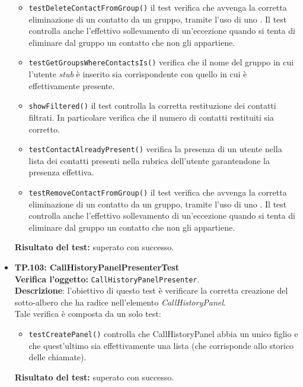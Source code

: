 \begin{itemize}
\begin{itemize}
\item \texttt{testDeleteContactFromGroup()} il test verifica che avvenga la corretta eliminazione di un contatto da un gruppo, tramite l'uso di uno . Il test controlla anche l'effettivo sollevamento di un'eccezione quando si tenta di eliminare dal gruppo un contatto che non gli appartiene.
\item \texttt{testGetGroupsWhereContactsIs()} verifica che il nome del gruppo in cui l'utente \textit{stub} è inserito sia corrispondente con quello in cui è effettivamente presente.
\item \texttt{showFiltered()} il test controlla la corretta restituzione dei contatti filtrati. In particolare verifica che il numero di contatti restituiti sia corretto.
\item \texttt{testContactAlreadyPresent()} verifica la presenza di un utente nella lista dei contatti presenti nella rubrica dell'utente garantendone la presenza effettiva.
\item \texttt{testRemoveContactFromGroup()} il test verifica che avvenga la corretta eliminazione di un contatto da un gruppo, tramite l'uso di uno . Il test controlla anche l'effettivo sollevamento di un'eccezione quando si tenta di eliminare dal gruppo un contatto che non gli appartiene.
\end{itemize}
\textbf{Risultato del test:} superato con successo.

\item \textbf{TP.103: CallHistoryPanelPresenterTest}\\
\textbf{Verifica l'oggetto:} \texttt{CallHistoryPanelPresenter}.\\
\textbf{Descrizione}: l'obiettivo di questo test è verificare la corretta creazione del sotto-albero che ha radice nell'elemento \textit{CallHistoryPanel}.\\
Tale verifica è composta da un solo test:
\begin{itemize}
\item \texttt{testCreatePanel()} controlla che CallHistoryPanel abbia un unico figlio e che quest'ultimo sia effettivamente una lista (che corrisponde allo storico delle chiamate).
\end{itemize}
\textbf{Risultato del test:} superato con successo.


\end{itemize}
